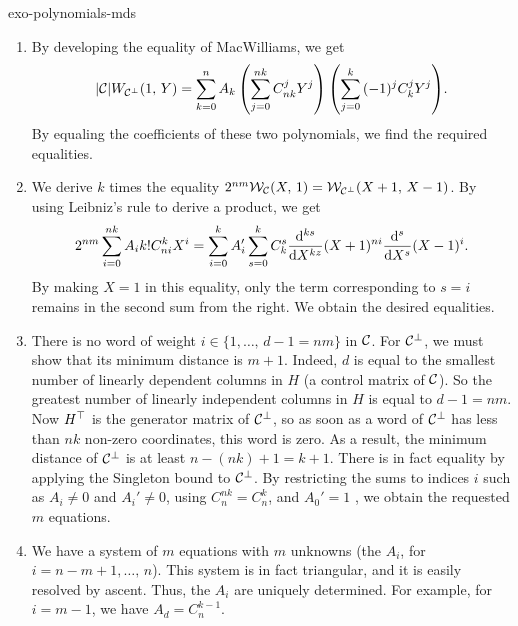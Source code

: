  
\begin{correction}{exo-polynomials-mds}
\begin{enumerate}
\item By developing the equality of MacWilliams, we get
\begin{equation*}
| \mathcal{C} | W_{\mathcal{C}^\bot} (1, \, Y) = \sum_{k = 0}^n{A_k \left(\sum_{j = 0}^{nk}{C_{nk}^j Y^j} \right) \left(\sum_{j = 0}^{k}{(- 1)^jC_{k}^j Y^j} \right)}.
\end{equation*}
By equaling the coefficients of these two polynomials, we find the required equalities.
\item We derive $ k $ times the equality $ 2^{nm} \mathcal{W}_{\mathcal{C}} (X, \, 1) = \mathcal{W}_{\mathcal{C}^\bot} (X+1, \, X-1) $. By using Leibniz's rule to derive a product, we get
\begin{equation*}
2^{nm} \sum_{i = 0}^{nk}{A_i k!C_{ni}^k X^i} = \sum_{i = 0}^k{A_i'\sum_{s = 0}^k{C_k^s \frac{\mathrm{d}^{ks}}{\mathrm{d} X^{kz}} (X+1)^{ni} \frac{\mathrm{d}^s}{\mathrm{d} X^s} (X-1)^i}}.
\end{equation*}
By making $ X = 1 $ in this equality, only the term corresponding to $ s = i $ remains in the second sum from the right. We obtain the desired equalities.
\item There is no word of weight $ i \in \{1, \ldots, \, d-1 = nm\} $ in $ \mathcal{C} $. For $ \mathcal{C}^\bot $, we must show that its minimum distance is $ m+1 $. Indeed, $ d $ is equal to the smallest number of linearly dependent columns in $ H $ (a control matrix of $ \mathcal{C} $). So the greatest number of linearly independent columns in $ H $ is equal to $ d-1 = nm $. Now $ H^\top $ is the generator matrix of $ \mathcal{C}^\bot $, so as soon as a word of $ \mathcal{C}^\bot $ has less than $ nk $ non-zero coordinates, this word is zero. As a result, the minimum distance of $ \mathcal{C}^\bot $ is at least $ n- (nk) +1 = k+1 $. There is in fact equality by applying the Singleton bound to $ \mathcal{C}^\bot $. By restricting the sums to indices $ i $ such as $ A_i \neq 0 $ and $ A_i'\neq 0 $, using $ C_{n}^{nk} = C_n^k $, and $ A_0' = 1 $ , we obtain the requested $ m $ equations.
\item We have a system of $ m $ equations with $ m $ unknowns (the $ A_i $, for $ i = n-m+1, \ldots, \, n $). This system is in fact triangular, and it is easily resolved by ascent. Thus, the $ A_i $ are uniquely determined. For example, for $ i = m-1 $, we have $ A_d = C_n^{k-1} $.
\end{enumerate}
\end{correction}
 
